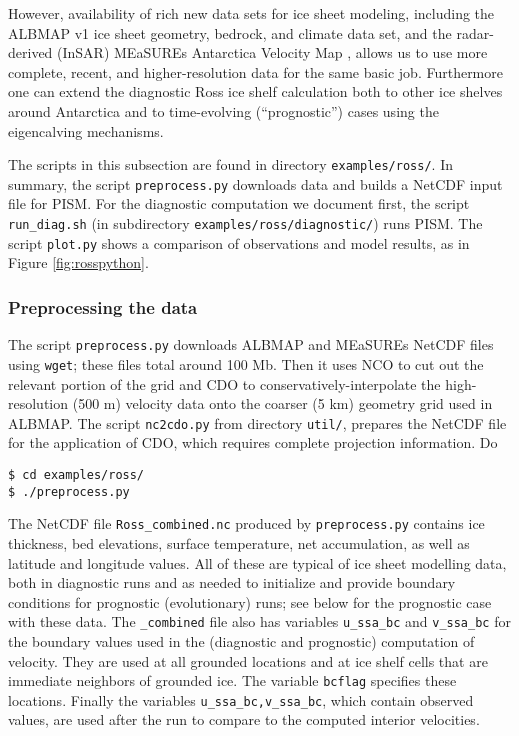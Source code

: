 However, availability of rich new data sets for ice sheet modeling, including the ALBMAP v1 \cite{LeBrocqetal2010} ice sheet geometry, bedrock, and climate data set, and the radar-derived (InSAR) MEaSUREs Antarctica Velocity Map \cite{Rignotetal2011}, allows us to use more complete, recent, and higher-resolution data for the same basic job.  Furthermore one can extend the diagnostic Ross ice shelf calculation both to other ice shelves around Antarctica and to time-evolving (``prognostic'') cases using the eigencalving \cite{Levermannetal2012} mechanisms.

The scripts in this subsection are found in directory \texttt{examples/ross/}.  In summary, the script \texttt{preprocess.py} downloads data and builds a NetCDF input file for PISM.  For the diagnostic computation we document first, the script \texttt{run_diag.sh} (in subdirectory \texttt{examples/ross/diagnostic/}) runs PISM.  The script \texttt{plot.py} shows a comparison of observations and model results, as in Figure \ref{fig:rosspython}.

\subsubsection*{Preprocessing the data}  The script \texttt{preprocess.py} downloads ALBMAP and MEaSUREs NetCDF files using \texttt{wget}; these files total around 100 Mb.  Then it uses NCO to cut out the relevant portion of the grid and CDO to conservatively-interpolate the high-resolution (500 m) velocity data onto the coarser (5 km) geometry grid used in ALBMAP.  The script \texttt{nc2cdo.py} from directory \texttt{util/}, prepares the NetCDF file for the application of CDO, which requires complete projection information.  Do

\begin{verbatim}
$ cd examples/ross/
$ ./preprocess.py
\end{verbatim}%

The NetCDF file \texttt{Ross_combined.nc} produced by \texttt{preprocess.py} contains ice thickness, bed elevations, surface temperature, net accumulation, as well as latitude and longitude values.  All of these are typical of ice sheet modelling data, both in diagnostic runs and as needed to initialize and provide boundary conditions for prognostic (evolutionary) runs; see below for the prognostic case with these data.  The \texttt{_combined} file also has variables \texttt{u_ssa_bc} and \texttt{v_ssa_bc} for the boundary values used in the (diagnostic and prognostic) computation of velocity.  They are used at all grounded locations and at ice shelf cells that are immediate neighbors of grounded ice.  The variable \texttt{bcflag} specifies these locations.  Finally the variables \texttt{u_ssa_bc,v_ssa_bc}, which contain observed values, are used after the run to compare to the computed interior velocities.

